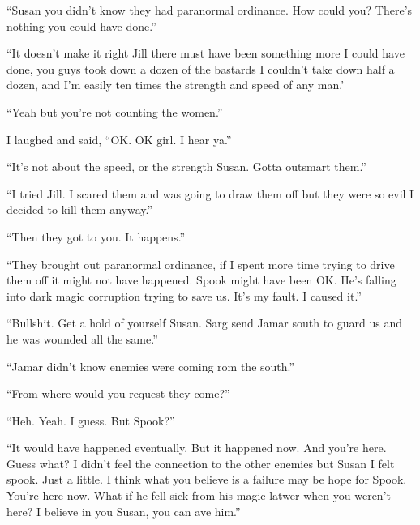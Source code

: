 ``Susan you didn't know they had paranormal ordinance. How could you? There's nothing you could have done.''  

``It doesn't make it right Jill there must have been something more I could have done, you guys took down a dozen of the bastards I couldn't take down half a dozen, and I'm easily ten times the strength and speed of any man.'

``Yeah but you're not counting the women.''

I laughed and said, ``OK. OK girl. I hear ya.''

``It's not about the speed, or the strength Susan. Gotta outsmart them.''

``I tried Jill. I scared them and was going to draw them off but they were so evil I decided to kill them anyway.''

``Then they got to you. It happens.''

``They brought out paranormal ordinance, if I spent more time trying to drive them off it might not have happened. Spook might have been OK. He's falling into dark magic corruption trying to save us. It's my fault. I caused it.''

``Bullshit. Get a hold of yourself Susan. Sarg send Jamar south to guard us and he was wounded all the same.''

``Jamar didn't know enemies were coming rom the south.''

``From where would you request they come?''

``Heh. Yeah. I guess. But Spook?''

``It would have happened eventually. But it happened now. And you're here. Guess what? I didn't feel the connection to the other enemies but Susan I felt spook. Just a little. I think what you believe is a failure may be hope for Spook. You're here now. What if he fell sick from his magic latwer when you weren't here? I believe in you Susan, you can ave him.''







